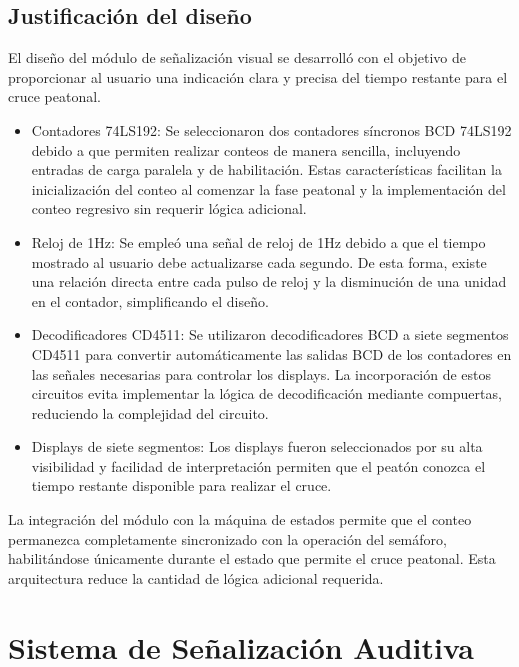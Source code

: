 \documentclass[12pt, journal, onecolumn]{IEEEtran}
\begin{document}
	
\subsection{Justificación del diseño}

El diseño del módulo de señalización visual se desarrolló con el objetivo de proporcionar al usuario una indicación clara y precisa del tiempo restante para el cruce peatonal.

\begin{itemize}

    \item Contadores 74LS192: Se seleccionaron dos contadores síncronos BCD 74LS192 debido a que permiten realizar conteos de manera sencilla, incluyendo entradas de carga paralela y de habilitación. Estas características facilitan la inicialización del conteo al comenzar la fase peatonal y la implementación del conteo regresivo sin requerir lógica adicional.

    \item Reloj de 1Hz: Se empleó una señal de reloj de 1Hz debido a que el tiempo mostrado al usuario debe actualizarse cada segundo. De esta forma, existe una relación directa entre cada pulso de reloj y la disminución de una unidad en el contador, simplificando el diseño.

    \item Decodificadores CD4511: Se utilizaron decodificadores BCD a siete segmentos CD4511 para convertir automáticamente las salidas BCD de los contadores en las señales necesarias para controlar los displays. La incorporación de estos circuitos evita implementar la lógica de decodificación mediante compuertas, reduciendo la complejidad del circuito.

    \item Displays de siete segmentos: Los displays fueron seleccionados por su alta visibilidad y facilidad de interpretación permiten que el peatón conozca el tiempo restante disponible para realizar el cruce.

\end{itemize}

La integración del módulo con la máquina de estados permite que el conteo permanezca completamente sincronizado con la operación del semáforo, habilitándose únicamente durante el estado que permite el cruce peatonal. Esta arquitectura reduce la cantidad de lógica adicional requerida.
	
\newpage
	
\section{\textbf{Sistema de Señalización Auditiva}}
\end{document}
